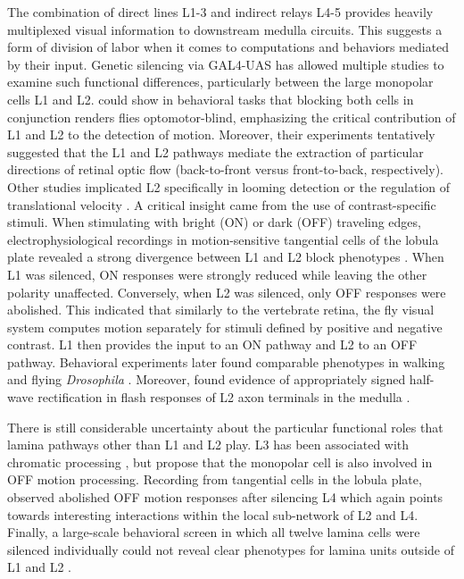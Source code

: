 The combination of direct lines L1-3 and indirect relays L4-5 provides heavily multiplexed visual information to downstream medulla circuits. This suggests a form of division of labor when it comes to computations and behaviors mediated by their input. Genetic silencing via GAL4-UAS has allowed multiple studies to examine such functional differences, particularly between the large monopolar cells L1 and L2. \citet{Rister:2007fn} could show in behavioral tasks that blocking both cells in conjunction renders flies optomotor-blind, emphasizing the critical contribution of L1 and L2 to the detection of motion. Moreover, their experiments tentatively suggested that the L1 and L2 pathways mediate the extraction of particular directions of retinal optic flow (back-to-front versus front-to-back, respectively). Other studies implicated L2 specifically in looming detection or the regulation of translational velocity \citep{deVries:2012aa,Katsov:2008iy}. A critical insight came from the use of contrast-specific stimuli. When stimulating with bright (ON) or dark (OFF) traveling edges, electrophysiological recordings in motion-sensitive tangential cells of the lobula plate revealed a strong divergence between L1 and L2 block phenotypes \citep{Joesch:2010fw}. When L1 was silenced, ON responses were strongly reduced while leaving the other polarity unaffected. Conversely, when L2 was silenced, only OFF responses were abolished. This indicated that similarly to the vertebrate retina, the fly visual system computes motion separately for stimuli defined by positive and negative contrast. L1 then provides the input to an ON pathway and L2 to an OFF pathway. Behavioral experiments later found comparable phenotypes in walking and flying \textit{Drosophila} \citep{Clark:2011gw,Tuthill:2013jk}. Moreover, \citet{Reiff:2010eo} found evidence of appropriately signed half-wave rectification in flash responses of L2 axon terminals in the medulla \citep[which may differ in dynamic stimulus regimes, see][]{Clark:2011gw,Strother:2014aa}.

There is still considerable uncertainty about the particular functional roles that lamina pathways other than L1 and L2 play. L3 has been associated with chromatic processing \citep{Gao:2008ik}, but \citet{Silies:2013jp} propose that the monopolar cell is also involved in OFF motion processing. Recording from tangential cells in the lobula plate, \citet{Meier:2014fr} observed abolished OFF motion responses after silencing L4 which again points towards interesting interactions within the local sub-network of L2 and L4. Finally, a large-scale behavioral screen in which all twelve lamina cells were silenced individually could not reveal clear phenotypes for lamina units outside of L1 and L2 \citep{Tuthill:2013jk,Tuthill:2014gc}.

